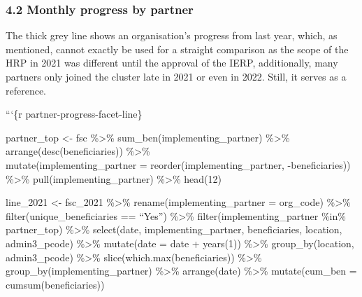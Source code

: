 \documentclass[
]{article}
\begin{document}
\hypertarget{monthly-progress-by-partner}{%
\subsubsection{4.2 Monthly progress by
partner}\label{monthly-progress-by-partner}}

The thick grey line shows an organisation's progress from last year,
which, as mentioned, cannot exactly be used for a straight comparison as
the scope of the HRP in 2021 was different until the approval of the
IERP, additionally, many partners only joined the cluster late in 2021
or even in 2022. Still, it serves as a reference.

```\{r partner-progress-facet-line\}

partner\_top \textless- fsc \%\textgreater\%
sum\_ben(implementing\_partner) \%\textgreater\%
arrange(desc(beneficiaries)) \%\textgreater\%\\
mutate(implementing\_partner = reorder(implementing\_partner,
-beneficiaries)) \%\textgreater\% pull(implementing\_partner)
\%\textgreater\% head(12)

line\_2021 \textless- fsc\_2021 \%\textgreater\%
rename(implementing\_partner = org\_code) \%\textgreater\%
filter(unique\_beneficiaries == ``Yes'') \%\textgreater\%
filter(implementing\_partner \%in\% partner\_top) \%\textgreater\%
select(date, implementing\_partner, beneficiaries, location,
admin3\_pcode) \%\textgreater\% mutate(date = date + years(1))
\%\textgreater\% group\_by(location, admin3\_pcode) \%\textgreater\%
slice(which.max(beneficiaries)) \%\textgreater\%
group\_by(implementing\_partner) \%\textgreater\% arrange(date)
\%\textgreater\% mutate(cum\_ben = cumsum(beneficiaries))
\end{document}
